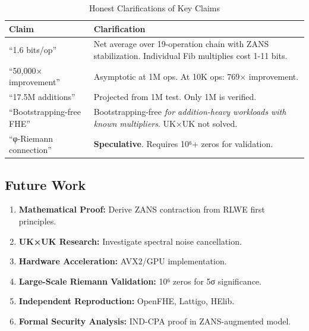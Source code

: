 \begin{table}[h]
\centering
\begin{tabular}{p{5cm}|p{8cm}}
\textbf{Claim} & \textbf{Clarification} \\
\hline
``1.6 bits/op'' & Net average over 19-operation chain with ZANS stabilization. Individual Fib multiplies cost 1-11 bits. \\
``50,000× improvement'' & Asymptotic at 1M ops. At 10K ops: 769× improvement. \\
``17.5M additions'' & Projected from 1M test. Only 1M is verified. \\
``Bootstrapping-free FHE'' & Bootstrapping-free \textit{for addition-heavy workloads with known multipliers}. UK×UK not solved. \\
``φ-Riemann connection'' & \textbf{Speculative}. Requires 10⁶+ zeros for validation.
\end{tabular}
\caption{Honest Clarifications of Key Claims}
\label{tab:clarifications}
\end{table}

\subsection{Future Work}

\begin{enumerate}
    \item \textbf{Mathematical Proof:} Derive ZANS contraction from RLWE first principles.
    
    \item \textbf{UK×UK Research:} Investigate spectral noise cancellation.
    
    \item \textbf{Hardware Acceleration:} AVX2/GPU implementation.
    
    \item \textbf{Large-Scale Riemann Validation:} 10⁶ zeros for 5σ significance.
    
    \item \textbf{Independent Reproduction:} OpenFHE, Lattigo, HElib.
    
    \item \textbf{Formal Security Analysis:} IND-CPA proof in ZANS-augmented model.
\end{enumerate}
